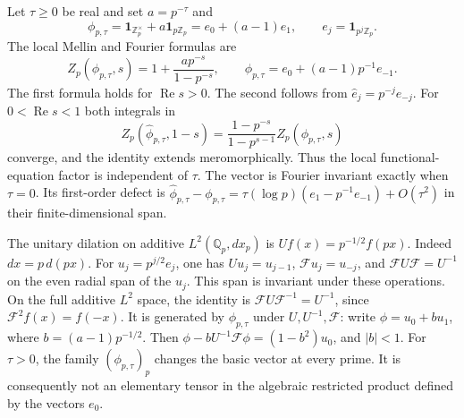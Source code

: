 Let $\tau\geq0$ be real and set $a=p^{-\tau}$ and
\[
 \phi_{p,\tau}=\mathbf1_{\mathbb Z_p^\times}+a\mathbf1_{p\mathbb Z_p}
              =e_0+(a-1)e_1,
 \qquad e_j=\mathbf1_{p^j\mathbb Z_p}.
\]
The local Mellin and Fourier formulas are
\begin{equation}
 Z_p(\phi_{p,\tau},s)=1+\frac{ap^{-s}}{1-p^{-s}},\qquad
 \widehat\phi_{p,\tau}=e_0+(a-1)p^{-1}e_{-1}.
 \label{syn-arith:modified-tate}
\end{equation}
The first formula holds for $\operatorname{Re}s>0$.
The second follows from $\widehat e_j=p^{-j}e_{-j}$.
For $0<\operatorname{Re}s<1$ both integrals in
\[
 Z_p(\widehat\phi_{p,\tau},1-s)
 =\frac{1-p^{-s}}{1-p^{s-1}}Z_p(\phi_{p,\tau},s)
\]
converge, and the identity extends meromorphically.
Thus the local functional-equation factor is independent of $\tau$.
The vector is Fourier invariant exactly when $\tau=0$.
Its first-order defect is
$\widehat\phi_{p,\tau}-\phi_{p,\tau}
=\tau(\log p)(e_1-p^{-1}e_{-1})+O(\tau^2)$ in their finite-dimensional span.

The unitary dilation on additive $L^2(\mathbb Q_p,dx_p)$ is
$Uf(x)=p^{-1/2}f(px)$.  Indeed $dx=p\,d(px)$.
For $u_j=p^{j/2}e_j$, one has $Uu_j=u_{j-1}$,
$\mathcal Fu_j=u_{-j}$, and $\mathcal F U\mathcal F=U^{-1}$ on the even radial span of the $u_j$.
This span is invariant under these operations. On the full additive $L^2$ space, the identity is $\mathcal F U\mathcal F^{-1}=U^{-1}$, since $\mathcal F^2f(x)=f(-x)$.
It is generated by $\phi_{p,\tau}$ under $U,U^{-1},\mathcal F$:
write $\phi=u_0+bu_1$, where $b=(a-1)p^{-1/2}$.
Then $\phi-bU^{-1}\mathcal F\phi=(1-b^2)u_0$, and $|b|<1$.
For $\tau>0$, the family $(\phi_{p,\tau})_p$ changes the basic vector at every prime.
It is consequently not an elementary tensor in the algebraic restricted product
defined by the vectors $e_0$.

